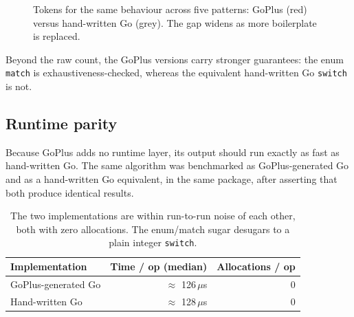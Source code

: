 \documentclass[11pt,a4paper]{article}
\begin{document}
\begin{figure}[ht]
\centering
{}
\caption{Tokens for the same behaviour across five patterns: GoPlus (red) versus
hand-written Go (grey). The gap widens as more boilerplate is replaced.}
\label{fig:tokens}
\end{figure}

Beyond the raw count, the GoPlus versions carry stronger guarantees: the enum
\texttt{match} is exhaustiveness-checked, whereas the equivalent hand-written Go
\texttt{switch} is not.

\subsection{Runtime parity}
Because GoPlus adds no runtime layer, its output should run exactly as fast as
hand-written Go. The same algorithm was benchmarked as GoPlus-generated Go and as
a hand-written Go equivalent, in the same package, after asserting that both
produce identical results.

\begin{table}[h]
\centering
\renewcommand{\arraystretch}{1.2}
\begin{tabularx}{\textwidth}{@{}X r r@{}}
\toprule
\textbf{Implementation} & \textbf{Time / op (median)} & \textbf{Allocations / op} \\
\midrule
GoPlus-generated Go & \(\approx\) 126\,\(\mu\)s & 0 \\
Hand-written Go     & \(\approx\) 128\,\(\mu\)s & 0 \\
\bottomrule
\end{tabularx}
\caption{The two implementations are within run-to-run noise of each other, both
with zero allocations. The enum/match sugar desugars to a plain integer
\texttt{switch}.}
\end{table}
\end{document}

